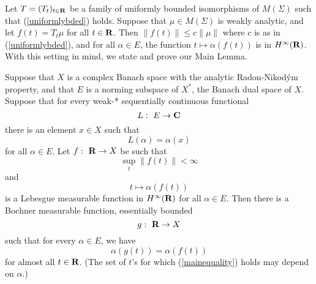Let $T=(T_t)_{t\in\R}$ be a family of 
uniformly bounded isomorphisms of $M(\Sigma)$
such that (\ref{uniformlybded}) holds.  
Suppose that $\mu\in M(\Sigma)$ is weakly analytic,
and let $f(t)=T_t\mu$ for all $t\in\R$.
Then $\|f(t)\|\leq c\|\mu\|$ 
where $c$ is as in (\ref{uniformlybded}), and
for all $\alpha\in E$, the function $t\mapsto \alpha(f(t))$
is in $H^\infty(\R)$.  With this setting in mind, we
state and prove our Main Lemma.
\begin{mainlemma}
Suppose that $X$ is a complex Banach space with the 
analytic Radon-Nikod\'ym property, and that $E$ is a norming 
subspace of $X^*$, the Banach dual space of $X$.  
Suppose that for every weak-* sequentially continuous functional 
\begin{equation}
L:\ E\rightarrow \C
\label{functional}
\end{equation}
there is an element $x\in X$ such that 
\begin{equation}
L(\alpha)=\alpha(x)
\label{lofeinlemma}
\end{equation}
for all $\alpha\in E$.  Let $f:\ \R\rightarrow X$ be such that 
\begin{equation}
\sup_t\|f(t)\|<\infty
\label{fbded}
\end{equation}
and
\begin{equation}
t\mapsto \alpha(f(t))
\label{fmble}
\end{equation}
is a Lebesgue measurable function in $H^\infty(\R)$ 
for all $\alpha\in E$.  Then there is a 
Bochner measurable function, essentially bounded
\begin{equation}
g:\ \R\rightarrow X
\label{gft}
\end{equation}
 such that for every $\alpha\in E$, we have 
\begin{equation}
\alpha(g(t))=\alpha(f(t))
\label{mainequality}
\end{equation}
for almost all $t\in \R$.  (The set of $t$'s 
for which (\ref{mainequality}) 
holds may depend on $\alpha$.)
\label{mainlemma}
\end{mainlemma}
